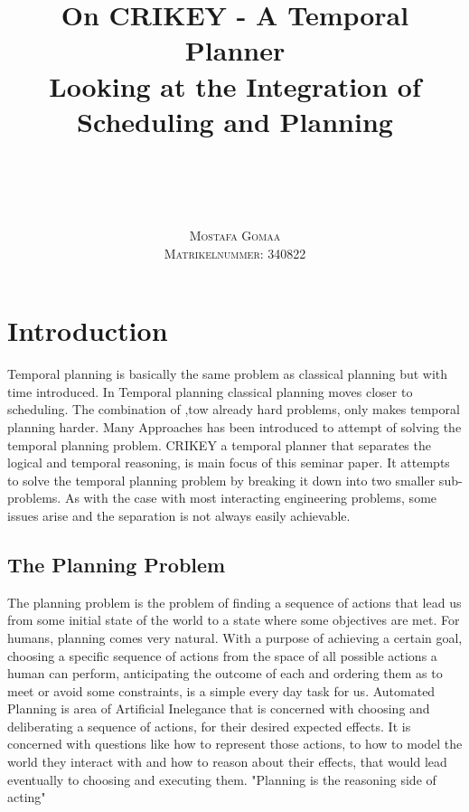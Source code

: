 \documentclass
[a4paper
,english
,parskip=half
,bibliography=totoc
]{scrreprt}
\title{
    On CRIKEY - A Temporal Planner\\ 
    Looking at the Integration of\\
    Scheduling and Planning
}
\author{
    \\
    \\
    \\
    \\
    \scshape Mostafa Gomaa\\
    \scshape \small Matrikelnummer: 340822
}
\date{}
\begin{document}
\pagestyle{useheadings}
\maketitle
\tableofcontents
\cleardoublepage
\pagestyle{scrheadings}




\chapter{Introduction}

Temporal planning is basically the same problem as classical planning but with time introduced. In Temporal planning classical planning moves closer to scheduling. The combination of ,tow already hard problems, only makes temporal planning harder. Many Approaches has been introduced to attempt of solving the temporal planning problem.
CRIKEY a temporal planner that separates the logical and temporal reasoning, is main focus of this seminar paper. It attempts to solve the temporal planning problem by breaking it down into two smaller sub-problems. As with the case with most interacting engineering problems, some issues arise and the separation is not always easily achievable.  

    \section{The Planning Problem} \label{the_planning_problem}
    The planning problem is the problem of finding a sequence of actions that lead us from some initial state of the world to a state where some objectives are met. For humans, planning comes very natural. With a purpose of achieving a certain goal, choosing a specific sequence of actions from the space of all possible actions a human can perform, anticipating the outcome of each and ordering them as to meet or avoid some constraints, is a simple every day task for us. Automated Planning is area of Artificial Inelegance that is concerned with choosing and deliberating a sequence of actions, for their desired expected effects. It is concerned with questions like how to represent those actions, to how to model the world they interact with and how to reason about their effects, that would lead eventually to choosing and executing them.
    "Planning is the reasoning side of acting" \citep{automated_planning}
\end{document}
